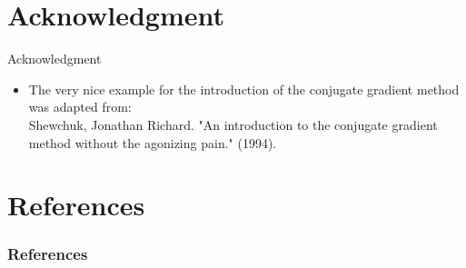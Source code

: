 \documentclass[12pt,t]{beamer}
\begin{document}
\section*{Acknowledgment}

\begin{frame}{Acknowledgment}
\begin{itemize}
\item The very nice example for the introduction of the conjugate gradient method was adapted from:\\
\vspace{0.25cm}
Shewchuk, Jonathan Richard. "An introduction to the conjugate gradient method without the agonizing pain." (1994).

\end{itemize}
\end{frame}

\section{References}

\begin{frame}[t, allowframebreaks]
\frametitle{References}


\end{frame}
\end{document}
